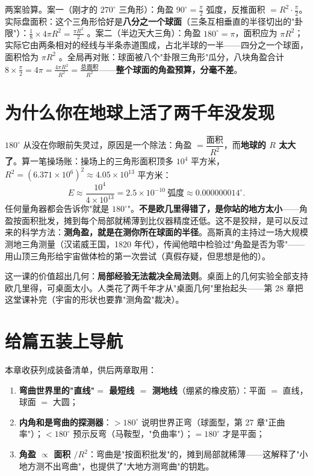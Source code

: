 两案验算。案一（刚才的 $270^\circ$ 三角形）：角盈 $90^\circ = \tfrac\pi2$ 弧度，反推面积 $= R^2\cdot\tfrac\pi2$。实际盘面积：这个三角形恰好是\textbf{八分之一个球面}（三条互相垂直的半径切出的"卦限"）：$\tfrac18\times4\pi R^2 = \tfrac{\pi R^2}2$ \checkmark。案二（半边天大三角）：角盈 $180^\circ = \pi$，面积应为 $\pi R^2$；实际它由两条相对的经线与半条赤道围成，占北半球的一半——四分之一个球面，面积恰为 $\pi R^2$ \checkmark。全局再对账：球面被八个"卦限三角形"瓜分，八块角盈合计 $8\times\tfrac\pi2 = 4\pi = \tfrac{4\pi R^2}{R^2} = \tfrac{\text{总面积}}{R^2}$——\textbf{整个球面的角盈预算，分毫不差}。

\section{为什么你在地球上活了两千年没发现}

$180^\circ$ 从没在你眼前失灵过，原因是一个除法：角盈 $= \dfrac{\text{面积}}{R^2}$，而\textbf{地球的 $R$ 太大了}。算一笔操场账：操场上的三角形面积顶多 $10^4$ 平方米，$R^2 = (6.371\times10^6)^2 \approx 4.05\times10^{13}$ 平方米：
\[
E \approx \frac{10^4}{4\times10^{13}} = 2.5\times10^{-10}\ \text{弧度} \approx 0.000000014^\circ .
\]
任何量角器都会告诉你"就是 $180^\circ$"。\textbf{不是欧几里得错了，是你站的地方太小}——角盈按面积批发，摊到每个局部就稀薄到比仪器精度还低。这不是狡辩，是可以反过来的科学方法：\textbf{测角盈，就是在测你所在球面的半径}。高斯真的主持过一场大规模测地三角测量（汉诺威王国，1820 年代），传闻他暗中检验过"角盈是否为零"——用山顶三角形给宇宙做体检的第一次尝试（真假存疑，但思想是他的）。

这一课的价值超出几何：\textbf{局部经验无法裁决全局法则}。桌面上的几何实验全部支持欧几里得，可桌面太小。人类花了两千年才从"桌面几何"里抬起头——第 28 章把这堂课补完（宇宙的形状也要靠"测角盈"裁决）。

\section{给篇五装上导航}

本章收获列成装备清单，供后两章取用：

\begin{enumerate}
\item \textbf{弯曲世界里的"直线"$=$ 最短线 $=$ 测地线}（绷紧的橡皮筋）：平面 $=$ 直线，球面 $=$ 大圆；
\item \textbf{内角和是弯曲的探测器}：$> 180^\circ$ 说明世界正弯（球面型，第 27 章"正曲率"）；$< 180^\circ$ 预示反弯（马鞍型，"负曲率"）；$= 180^\circ$ 才是平面；
\item \textbf{角盈 $\propto$ 面积 $/ R^2$}：弯曲是"按面积批发"的，摊到局部就稀薄——这解释了"小地方测不出弯曲"，也提供了"大地方测弯曲"的钥匙。
\end{enumerate}


